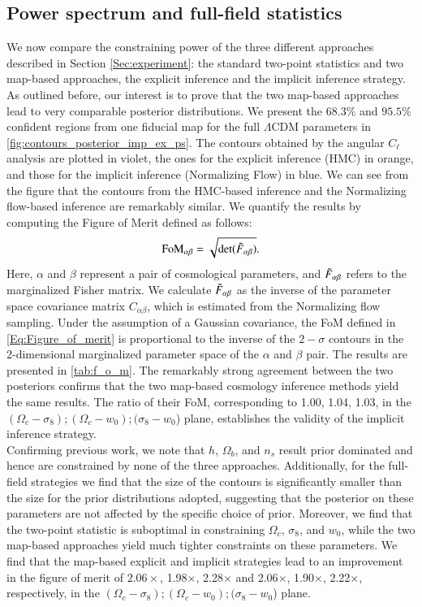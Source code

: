 \documentclass{aa}
\begin{document}
\subsection{Power spectrum and full-field statistics}
We now compare the constraining power of the three different approaches described in Section \ref{Sec:experiment}: the standard two-point statistics and two map-based approaches, the explicit inference and the implicit inference strategy. 
As outlined before, our interest is to prove that the two map-based approaches lead to very comparable posterior distributions. We present the $68.3\%$ and $95.5\%$ confident regions from one fiducial map for the full $\Lambda$CDM parameters in \autoref{fig:contours_posterior_imp_ex_ps}. The contours obtained by the angular $C_{\ell}$ analysis are plotted in violet, the ones for the explicit inference (HMC) in orange, and those for the implicit inference (Normalizing Flow) in blue. 
We can see from the figure that the contours from the HMC-based inference and the Normalizing flow-based inference are remarkably similar.  We quantify the results by computing the Figure of Merit defined as follows:
\begin{equation}\label{Eq:Figure_of_merit}
    \text{FoM}_{\alpha \beta}=\sqrt{\text{det}(\Tilde{F}_{\alpha \beta})}.
\end{equation}
Here, $\alpha$ and $\beta$ represent a pair of cosmological parameters, and $\Tilde{F}_{\alpha \beta}$ refers to the marginalized Fisher matrix. We calculate $\Tilde{F}_{\alpha \beta}$ as the inverse of the parameter space covariance matrix $C_{\alpha \beta}$, which is estimated from the Normalizing flow sampling. 
Under the assumption of a Gaussian covariance, the FoM defined in \autoref{Eq:Figure_of_merit} is proportional to the inverse of the $2-\sigma$ contours in the 2-dimensional marginalized parameter space of the $\alpha$ and $\beta$ pair.
The results are presented in \autoref{tab:f_o_m}.
The remarkably strong agreement between the two posteriors confirms that the two map-based cosmology inference methods yield the same results. The ratio of their FoM, corresponding to 1.00, 1.04, 1.03, in the $(\Omega_c-\sigma_8); (\Omega_c-w_0); (\sigma_8-w_0$) plane, establishes the validity of the implicit inference strategy. \\
Confirming previous work, we note that $h$, $\Omega_b$, and $n_s$ result prior dominated and hence are constrained by none of the three approaches. 
Additionally, for the full-field strategies we find that the size of the contours is significantly smaller than the size for the prior distributions adopted, suggesting that the 
posterior on these parameters are not affected by the specific choice of prior.
Moreover, we find that the two-point statistic is suboptimal in constraining $\Omega_c$, $\sigma_8$, and $w_0$, while the two map-based approaches yield much tighter constraints on these parameters. 
We find that the map-based explicit and implicit strategies lead to an improvement in the figure of merit of $2.06\times$, 1.98$\times$, 2.28$\times$ and 2.06$\times$, 1.90$\times$, 2.22$\times$, respectively, in the $(\Omega_c-\sigma_8); (\Omega_c-w_0); (\sigma_8-w_0$) plane.
\end{document}
